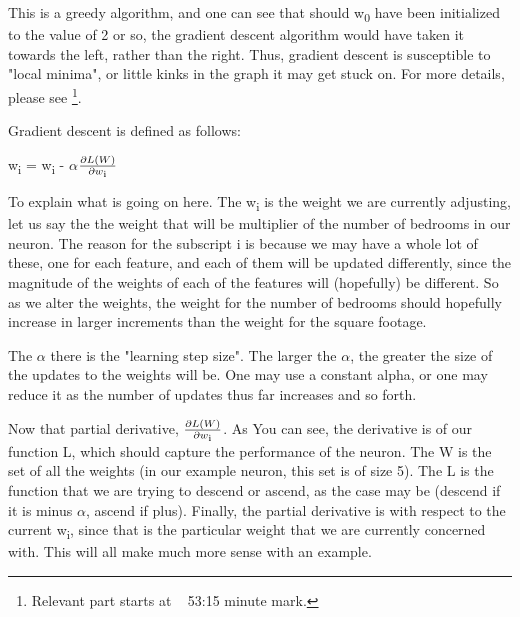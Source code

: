 \documentclass[a4paper, 12pt]{article}
\begin{document}
                        \par This is a greedy algorithm, and one can see that should w\textsubscript{0} have been initialized to the value of 2 or so, the gradient descent algorithm would have taken it towards the left, rather than the right. Thus, gradient descent is susceptible to "local minima", or little kinks in the graph it may get stuck on. For more details, please see \cite{logisticRegression}\footnote{Relevant part starts at ~ 53:15 minute mark.}.
                        
                        \par Gradient descent is defined as follows:
                        
                        \par {\LARGE w\textsubscript{i} = w\textsubscript{i} - 
                        \(\alpha\)\(\frac{\partial L(W)}{\partial w\textsubscript{i}}\)}
                        
                        \bigskip
                        
                        \par To explain what is going on here. The w\textsubscript{i} is the weight we are currently adjusting, let us say the the weight that will be multiplier of the number of bedrooms in our neuron. The reason for the subscript i is because we may have a whole lot of these, one for each feature, and each of them will be updated differently, since the magnitude of the weights of each of the features will (hopefully) be different. So as we alter the weights, the weight for the number of bedrooms should hopefully increase in larger increments than the weight for the square footage.
                        
                        \par The \(\alpha\) there is the "learning step size". The larger the \(\alpha\), the greater the size of the updates to the weights will be. One may use a constant alpha, or one may reduce it as the number of updates thus far increases and so forth.
                        
                        \par Now that partial derivative, {\Large \(\frac{\partial L(W)}{\partial w\textsubscript{i}}\)}. As You can see, the derivative is of our function L, which should capture the performance of the neuron. The W is the set of all the weights (in our example neuron, this set is of size 5). The L is the function that we are trying to descend or ascend, as the case may be (descend if it is minus \(\alpha\), ascend if plus). Finally, the partial derivative is with respect to the current w\textsubscript{i}, since that is the particular weight that we are currently concerned with. This will all make much more sense with an example.
                        
\end{document}

